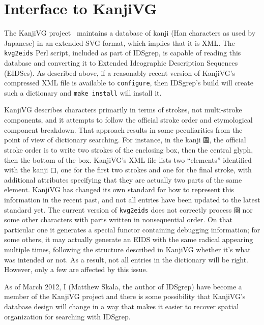 \documentclass[twocolumn]{report}
\begin{document}

\section{Interface to KanjiVG}

The KanjiVG project~\cite{KanjiVG} maintains a database of kanji (Han
characters as used by Japanese) in an extended SVG format, which implies
that it is XML.  The \texttt{kvg2eids} Perl script, included as part of
IDSgrep, is capable of reading this database and converting it to Extended
Ideographic Description Sequences (EIDSes).  As described above, if a
reasonably recent version of KanjiVG's compressed XML file is available to
\texttt{configure}, then IDSgrep's build will create such a dictionary and
\texttt{make install} will install it.

KanjiVG describes characters primarily in terms of strokes, not multi-stroke
components, and it attempts to follow the official stroke order and
etymological component breakdown.  That approach results in some
peculiarities from the point of view of dictionary searching.  For instance,
in the kanji \texttt{園}, the official stroke order is to write two strokes
of the enclosing box, then the central glyph, then the bottom of the box. 
KanjiVG's XML file lists two ``elements'' identified with the kanji
\texttt{囗}, one for the first two strokes and one for the final stroke,
with additional attributes specifying that they are actually two parts of
the same element.  KanjiVG has changed its own standard for how to represent
this information in the recent past, and not all entries have been updated
to the latest standard yet.  The current version of \texttt{kvg2eids} does
not correctly process \texttt{園} nor some other characters with parts
written in nonsequential order.  On that particular one it generates a
special functor containing debugging information; for some others, it may
actually generate an EIDS with the same radical appearing multiple times,
following the structure described in KanjiVG whether it's what was intended
or not.  As a result, not all entries in the dictionary will be right. 
However, only a few are affected by this issue.

As of March 2012, I (Matthew Skala, the author of IDSgrep) have become a
member of the KanjiVG project and there is some possibility that KanjiVG's
database design will change in a way that makes it easier to recover spatial
organization for searching with IDSgrep.
\end{document}
